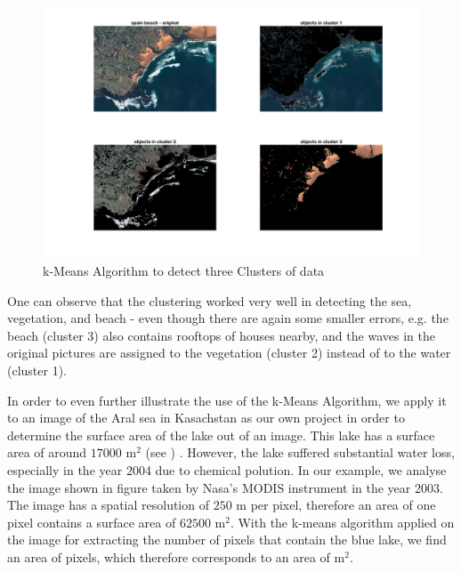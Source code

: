 \begin{figure}[H]
	\centering
	\includegraphics[width=\textwidth]{images/kMeans.png}
	\caption{k-Means Algorithm to detect three Clusters of data}
	\label{fig:kmeans}
\end{figure}

One can observe that the clustering worked very well in detecting the sea, vegetation, and beach - even though there are again some smaller errors, e.g. the beach (cluster 3) also contains rooftops of houses nearby, and the waves in the original pictures are assigned to the vegetation (cluster 2) instead of to the water (cluster 1).

In order to even further illustrate the use of the k-Means Algorithm, we apply it to an image of the Aral sea in Kasachstan as our own project in order to determine the surface area of the lake out of an image. This lake has a surface area of around  $17000\text{ m}^{2}$ (see \protect\footnotemark)  . However, the lake suffered substantial water loss, especially in the year 2004 due to chemical polution. In our example, we analyse the image shown in figure  taken by Nasa's MODIS instrument in the year 2003. The image has a spatial resolution of $250$ m per pixel, therefore an area of one pixel contains a surface area of $62500\text{ m}^{2}$. With the k-means algorithm applied on the image for extracting the number of pixels that contain the blue lake, we find an area of   pixels, which therefore corresponds to an area of   $\text{m}^{2}$. 

